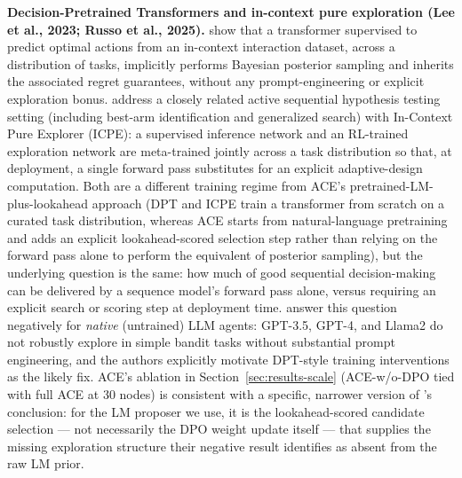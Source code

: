 \textbf{Decision-Pretrained Transformers and in-context pure exploration (Lee et al., 2023; Russo et al., 2025).} \citet{lee2023supervised} show that a transformer supervised to predict optimal actions from an in-context interaction dataset, across a distribution of tasks, implicitly performs Bayesian posterior sampling and inherits the associated regret guarantees, without any prompt-engineering or explicit exploration bonus. \citet{russo2025incontext} address a closely related active sequential hypothesis testing setting (including best-arm identification and generalized search) with In-Context Pure Explorer (ICPE): a supervised inference network and an RL-trained exploration network are meta-trained jointly across a task distribution so that, at deployment, a single forward pass substitutes for an explicit adaptive-design computation. Both are a different training regime from ACE's pretrained-LM-plus-lookahead approach (DPT and ICPE train a transformer from scratch on a curated task distribution, whereas ACE starts from natural-language pretraining and adds an explicit lookahead-scored selection step rather than relying on the forward pass alone to perform the equivalent of posterior sampling), but the underlying question is the same: how much of good sequential decision-making can be delivered by a sequence model's forward pass alone, versus requiring an explicit search or scoring step at deployment time. \citet{krishnamurthy2024explore} answer this question negatively for \emph{native} (untrained) LLM agents: GPT-3.5, GPT-4, and Llama2 do not robustly explore in simple bandit tasks without substantial prompt engineering, and the authors explicitly motivate DPT-style training interventions as the likely fix. ACE's ablation in Section~\ref{sec:results-scale} (ACE-w/o-DPO tied with full ACE at 30 nodes) is consistent with a specific, narrower version of \citet{krishnamurthy2024explore}'s conclusion: for the LM proposer we use, it is the lookahead-scored candidate selection --- not necessarily the DPO weight update itself --- that supplies the missing exploration structure their negative result identifies as absent from the raw LM prior.
